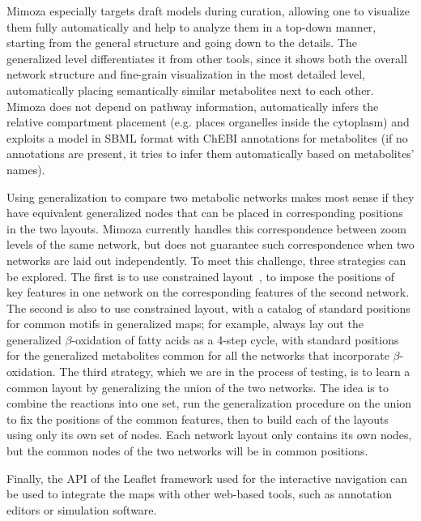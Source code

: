 \documentclass{bmcart}
\begin{document}
Mimoza especially targets draft models during curation, allowing one to visualize them fully automatically and help to analyze them in a top-down manner, starting from the general structure and going down to the details. The generalized level differentiates it from other tools, since it shows both the overall network structure and fine-grain visualization in the most detailed level, automatically placing semantically similar metabolites next to each other. Mimoza does not depend on pathway information, automatically infers the relative compartment placement (e.g. places organelles inside the cytoplasm) and exploits a model in SBML format with ChEBI annotations for metabolites (if no annotations are present, it tries to infer them automatically based on metabolites' names).

Using generalization to compare two metabolic networks makes most sense if they have equivalent generalized nodes that can be placed in corresponding positions in the two layouts. Mimoza currently handles this correspondence between zoom levels of the same network, but does not guarantee such correspondence when two networks are laid out independently.
To meet this challenge, three strategies can be explored.
The first is to use constrained layout~\cite{Karl-FriedrichBohringer}, to impose the positions of key features in one network on the corresponding features of the second network.
The second is also to use constrained layout, with a catalog of standard positions for common motifs in generalized maps; for example, always lay out the generalized $\beta$-oxidation of fatty acids as a 4-step cycle, with standard positions for the generalized metabolites common for all the networks that incorporate $\beta$-oxidation.
The third strategy, which we are in the process of testing, is to learn a common layout by generalizing the union of the two networks. The idea is to combine the reactions into one set, run the generalization procedure on the union to fix the positions of the common features, then to build each of the layouts using only its own set of nodes. Each network layout only contains its own nodes, but the common nodes of the two networks will be in common positions.


Finally, the API of the Leaflet framework used for the interactive navigation can be used to integrate the maps with other web-based tools, such as annotation editors or simulation software.
\end{document}

